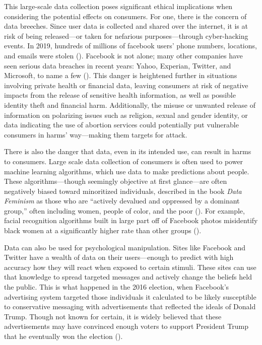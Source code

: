 \documentclass[water,article,submit,moreauthors,pdftex]{mdpi}
\begin{document}
This large-scale data collection poses significant ethical implications
when considering the potential effects on consumers. For one, there is
the concern of data breeches. Since user data is collected and shared
over the internet, it is at risk of being released---or taken for
nefarious purposes---through cyber-hacking events. In 2019, hundreds of
millions of facebook users' phone numbers, locations, and emails were
stolen (\citet{fb-breach}). Facebook is not alone; many other companies
have seen serious data breaches in recent years: Yahoo, Experian,
Twitter, and Microsoft, to name a few (\citet{breaches-history}). This
danger is heightened further in situations involving private health or
financial data, leaving consumers at risk of negative impacts from the
release of sensitive health information, as well as possible identity
theft and financial harm. Additionally, the misuse or unwanted release
of information on polarizing issues such as religion, sexual and gender
identity, or data indicating the use of abortion services could
potentially put vulnerable consumers in harms' way---making them targets
for attack.

There is also the danger that data, even in its intended use, can result
in harms to consumers. Large scale data collection of consumers is often
used to power machine learning algorithms, which use data to make
predictions about people. These algorithms---though seemingly objective
at first glance---are often negatively biased toward minoritized
individuals, described in the book \emph{Data Feminism} as those who are
``actively devalued and oppressed by a dominant group,'' often including
women, people of color, and the poor (\citet{d2020data}). For example,
facial recognition algorithms built in large part off of Facebook photos
misidentify black women at a significantly higher rate than other groups
(\citet{buolamwini2018gender}).

Data can also be used for psychological manipulation. Sites like
Facebook and Twitter have a wealth of data on their users---enough to
predict with high accuracy how they will react when exposed to certain
stimuli. These sites can use that knowledge to spread targeted messages
and actively change the beliefs held the public. This is what happened
in the 2016 election, when Facebook's advertising system targeted those
individuals it calculated to be likely susceptible to conservative
messaging with advertisements that reflected the ideals of Donald Trump.
Though not known for certain, it is widely believed that these
advertisements may have convinced enough voters to support President
Trump that he eventually won the election (\citet{fb-election}).
\end{document}
